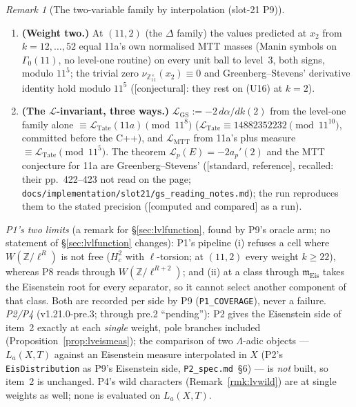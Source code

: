 \documentclass[11pt]{article}
\theoremstyle{remark}
\newtheorem{remark}[theorem]{Remark}
\newcommand{\Z}{\mathbb{Z}}
\newcommand{\m}{\mathfrak{m}}
\newcommand{\STD}{\textsf{[standard, reference]}}
\newcommand{\CONJ}{\textsf{[conjectural]}}
\newcommand{\CMPD}{\textsf{[computed and compared]}}   %
\begin{document}
\begin{remark}[The two-variable family by interpolation (slot-21 P9)]
\begin{enumerate}
  $(X-\alpha_a)$ (Mazur--Kitagawa, recalled; the interpolation of Claim~\ref{cl:lvmeascong} in $k$), is \CONJ; the run is evidence for it and for (U16).
\item \textbf{(Weight two.)} At $(11,2)$ (the $\Delta$ family) the values predicted at $x_2$ from $k=12,\dots,52$ equal 11a's own normalised MTT masses (Manin symbols on $\Gamma_0(11)$, no
  level-one routine) on every unit ball to level~$3$, both signs, modulo $11^{5}$; the trivial zero $\nu_{\Z_{11}^{\times}}(x_2)\equiv0$ and Greenberg--Stevens' derivative identity hold modulo $11^{5}$
  (\CONJ: they rest on (U16) at $k=2$).
\item \textbf{(The $\mathcal L$-invariant, three ways.)} $\mathcal L_{\mathrm{GS}}:=-2\,d\alpha/dk(2)$ from the level-one family alone $\equiv\mathcal L_{\mathrm{Tate}}(11a)\pmod{11^{8}}$
  ($\mathcal L_{\mathrm{Tate}}\equiv14882352232\pmod{11^{10}}$, committed before the C++), and $\mathcal L_{\mathrm{MTT}}$ from 11a's plus measure $\equiv\mathcal L_{\mathrm{Tate}}\pmod{11^{5}}$. The theorem
  $\mathcal L_p(E)=-2a_p'(2)$ and the MTT conjecture for 11a are Greenberg--Stevens' (\STD, recalled: their pp.~422--423 not read on the page; \texttt{docs/implementation/slot21/gs\_reading\_notes.md});
  the run reproduces them to the stated precision (\CMPD{} as a run).
\end{enumerate}
\emph{P1's two limits} (a remark for \S\ref{sec:lvlfunction}, found by P9's oracle arm; no statement of \S\ref{sec:lvlfunction} changes): P1's pipeline (i) refuses a cell where $W(\Z/\ell^{R})$ is not free
($H^{2}_c$ with $\ell$-torsion; at $(11,2)$ every weight $k\ge22$), whereas P8 reads through $W(\Z/\ell^{R+2})$; and (ii) at a class through $\m_{\mathrm{Eis}}$ takes the Eisenstein root for
every separator, so it cannot select another component of that class. Both are recorded per side by P9 (\texttt{P1\_COVERAGE}), never a failure. \emph{P2/P4} (v1.21.0-pre.3; through pre.2
``pending''): P2 gives the Eisenstein side of item~2 exactly at each \emph{single} weight, pole branches included (Proposition~\ref{prop:lveismeas}); the comparison of two $\Lambda$-adic objects
--- $L_a(X,T)$ against an Eisenstein measure interpolated in $X$ (P2's \texttt{EisDistribution} as P9's Eisenstein side, \texttt{P2\_spec.md}~\S6) --- is \emph{not} built, so item~2 is unchanged.
P4's wild characters (Remark~\ref{rmk:lvwild}) are at single weights as well; none is evaluated on $L_a(X,T)$.
\end{remark}
\end{document}
